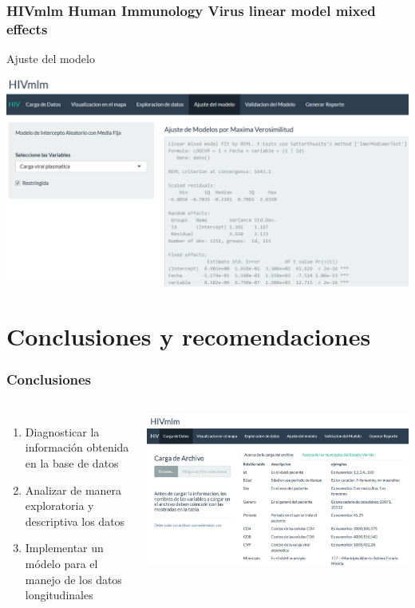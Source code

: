 \documentclass{beamer}%
\begin{document}
\begin{frame}
\frametitle{\textbf{HIVmlm Human Immunology Virus linear model mixed effects}}
 
  	Ajuste del modelo
  	 \begin{center}\includegraphics[height=0.6\textheight]{ajuste.PNG}\end{center}
  
\end{frame}

\section{Conclusiones y recomendaciones}


\begin{frame}
\frametitle{\textbf{Conclusiones}}
\begin{columns}[t]

  \begin{enumerate}
  \item Diagnosticar la informaci\'on obtenida en la base de datos 
  \item Analizar de manera exploratoria y descriptiva los datos
  \item Implementar un m\'odelo para el manejo de los datos longitudinales
  \end{enumerate}

   \begin{center}\includegraphics[height=0.4\textheight]{HIVmlm.PNG}\end{center}
  \end{columns}
\end{frame}
\end{document}
